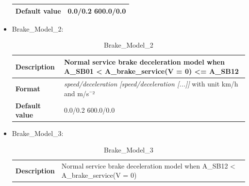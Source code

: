 \begin{itemize}
\begin{longtable}{|l|l|}
		\begin{minipage}[t]{0.22\linewidth} \textbf{Default value}	\end{minipage}
		&	\begin{minipage}[t]{0.78\linewidth} 0.0/0.2 600.0/0.0 \end{minipage} \\
		
		\hline
	\end{longtable}
	
	
	\item Brake\_Model\_2:
	\begin{longtable}{|l|l|}
		\caption{Brake\_Model\_2}\\
		\hline
		
		\begin{minipage}[t]{0.22\linewidth} \textbf{Description}	\end{minipage}
		&	\begin{minipage}[t]{0.78\linewidth} Normal service brake deceleration model when A\_SB01 < A\_brake\_service(V = 0) <= A\_SB12 \end{minipage} \\
		
		\hline
		
		\begin{minipage}[t]{0.22\linewidth} \textbf{Format}	\end{minipage}
		&	\begin{minipage}[t]{0.78\linewidth} \textit{speed/deceleration [speed/deceleration [...]]}  with unit km/h and m/s¯²\end{minipage} \\
		
		\hline
		
		\begin{minipage}[t]{0.22\linewidth} \textbf{Default value}	\end{minipage}
		&	\begin{minipage}[t]{0.78\linewidth} 0.0/0.2 600.0/0.0 \end{minipage} \\
		
		\hline
	\end{longtable}
	
	
	\item Brake\_Model\_3:
	\begin{longtable}{|l|l|}
		\caption{Brake\_Model\_3}\\
		\hline
		
		\begin{minipage}[t]{0.22\linewidth} \textbf{Description}	\end{minipage}
		&	\begin{minipage}[t]{0.78\linewidth} Normal service brake deceleration model when A\_SB12 < A\_brake\_service(V = 0) \end{minipage} \\
		

\end{longtable}
\end{itemize}
